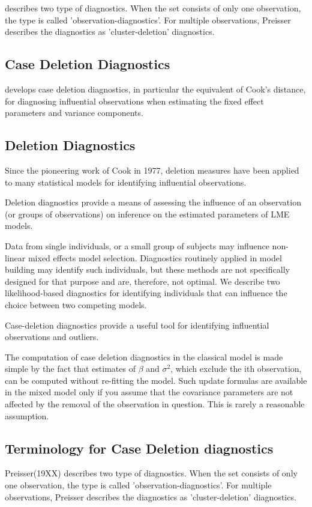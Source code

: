 \documentclass[Chap5amain.tex]{subfiles}
\begin{document}
\citet{preisser} describes two type of diagnostics. When the set consists of only one observation, the type is called
'observation-diagnostics'. For multiple observations, Preisser describes the diagnostics as 'cluster-deletion' diagnostics.


\subsection{Case Deletion Diagnostics} %

\citet{CPJ} develops  case deletion diagnostics, in particular the equivalent of  Cook's distance, for diagnosing influential observations when estimating the fixed effect parameters and variance components.

\subsection{Deletion Diagnostics}

Since the pioneering work of Cook in 1977, deletion measures have been applied to many statistical models for identifying influential observations.

Deletion diagnostics provide a means of assessing the influence of an observation (or groups of observations) on inference on the estimated parameters of LME models.

Data from single individuals, or a small group of subjects may influence non-linear mixed effects model selection. Diagnostics routinely applied in model building may identify such individuals, but these methods are not specifically designed for that purpose and are, therefore, not optimal. We describe two likelihood-based diagnostics for identifying individuals that can influence the choice between two competing models.

Case-deletion diagnostics provide a useful tool for identifying influential observations and outliers.

The computation of case deletion diagnostics in the classical model is made simple by the fact that estimates of $\beta$ and $\sigma^2$, which exclude the ith observation, can be computed without re-fitting the model. Such update formulas are available in the mixed model only if you assume that the covariance parameters are not affected by the removal of the observation in question. This is rarely a reasonable assumption.


\subsection{Terminology for Case Deletion diagnostics} %
Preisser(19XX) describes two type of diagnostics. When the set consists of only one observation, the type is called
'observation-diagnostics'. For multiple observations, Preisser describes the diagnostics as 'cluster-deletion' diagnostics.
\end{document}

